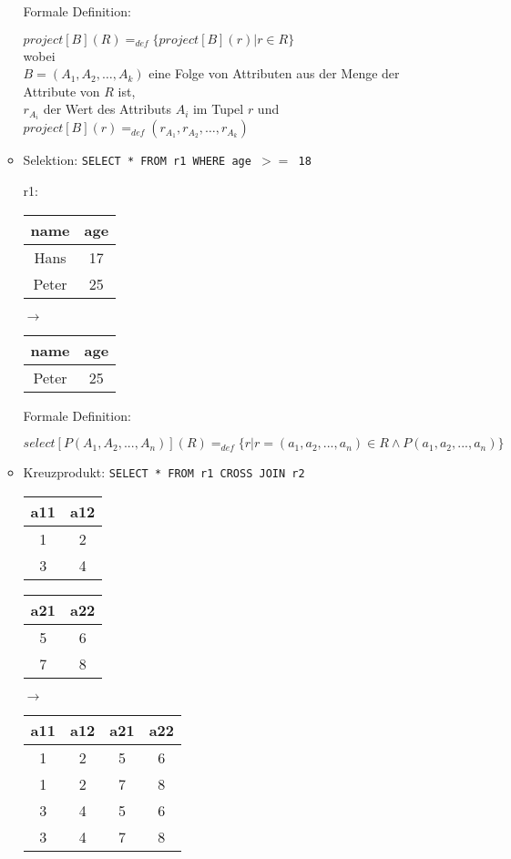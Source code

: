 \begin{enumerate}[a)]
\begin{solution}
\begin{itemize}
		Formale Definition:

		\(project[B](R) = _{def} \{project[B](r) | r \in R\}\) \\
		wobei\\
		$B = (A_1, A_2, \ldots, A_k)$ eine Folge von Attributen aus der Menge der Attribute von $R$ ist,\\
		$r_{A_i}$ der Wert des Attributs $A_i$ im Tupel $r$
		und\\
		\(project[B](r) = _{def} (r_{A_1}, r_{A_2}, \ldots, r_{A_k})\)

		\item Selektion: \texttt{SELECT * FROM r1 WHERE age $>=$ 18}

		r1: \\
		\begin{tabular}{ | c | c | }
			\hline
			name 	& 		age	\\
			\hline
			Hans 	& 		17 	\\
			\hline
			Peter 	&		25	\\
			\hline
		\end{tabular}
		$\rightarrow$
		\begin{tabular}{ | c | c | }
			\hline
			name 	&		age	\\
			\hline
			Peter		&		25	\\
			\hline
		\end{tabular}

		Formale Definition:

		\(select[P (A_1, A_2, ... , A_n)] (R) = _{def} \{r | r = (a_1, a_2, ... , a_n) \in R \wedge P (a_1, a_2, ... , a_n)\}\)


		\item Kreuzprodukt: \texttt{SELECT * FROM r1 CROSS JOIN r2}

		\begin{tabular}{ | c | c | }
			\hline
			a11		&		a12		\\
			\hline
			1 		& 		2 		\\
			\hline
			3 		& 		4 		\\
			\hline
		\end{tabular}
		\begin{tabular}{ | c | c | }
			\hline
			a21 	&		a22	\\
			\hline
			5 		& 		6 		\\
			\hline
			7 		& 		8 		\\
			\hline
		\end{tabular}
		$\rightarrow$
		\begin{tabular}{ | c | c | c | c | }
			\hline
			a11 	& 		a12 	&		a21 	& 		a22	\\
			\hline
			1 		& 		2 		&		5		& 		6 		\\
			\hline
			1 		& 		2 		&		7 		&		8 		\\
			\hline
			3 		& 		4 		& 		5 		& 		6 		\\
			\hline
			3 		& 		4		& 		7 		& 		8 		\\
			\hline
		\end{tabular}


\end{itemize}
\end{solution}
\end{enumerate}
